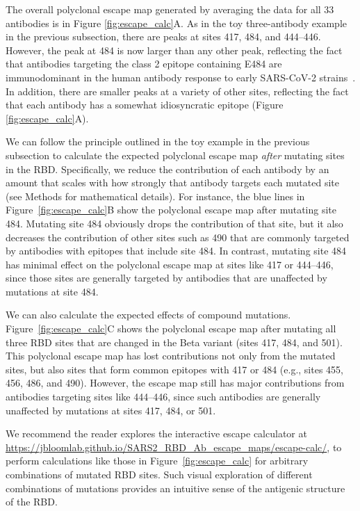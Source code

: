\documentclass[9pt,twocolumn,twoside]{gsajnl_modified}
\begin{document}
The overall polyclonal escape map generated by averaging the data for all 33 antibodies is in Figure \ref{fig:escape_calc}A.
As in the toy three-antibody example in the previous subsection, there are peaks at  sites 417, 484, and 444--446.
However, the peak at 484 is now larger than any other peak, reflecting the fact that antibodies targeting the class 2 epitope containing E484 are immunodominant in the human antibody response to early SARS-CoV-2 strains~\citep{yuan2020structural,robbiani2020convergent,greaney2021comprehensive,greaney2021mapping}.
In addition, there are smaller peaks at a variety of other sites, reflecting the fact that each antibody has a somewhat idiosyncratic epitope (Figure \ref{fig:escape_calc}A).

We can follow the principle outlined in the toy example in the previous subsection to calculate the expected polyclonal escape map \emph{after} mutating sites in the RBD.
Specifically, we reduce the contribution of each antibody by an amount that scales with how strongly that antibody targets each mutated site (see Methods for mathematical details).
For instance, the blue lines in Figure~\ref{fig:escape_calc}B show the polyclonal escape map after mutating site 484.
Mutating site 484 obviously drops the contribution of that site, but it also decreases the contribution of other sites such as 490 that are commonly targeted by antibodies with epitopes that include site 484.
In contrast, mutating site 484 has minimal effect on the polyclonal escape map at sites like 417 or 444--446, since those sites are generally targeted by antibodies that are unaffected by mutations at site 484.

We can also calculate the expected effects of compound mutations.
Figure~\ref{fig:escape_calc}C shows the polyclonal escape map after mutating all three RBD sites that are changed in the Beta variant (sites 417, 484, and 501).
This polyclonal escape map has lost contributions not only from the mutated sites, but also sites that form common epitopes with 417 or 484 (e.g., sites 455, 456, 486, and 490).
However, the escape map still has major contributions from antibodies targeting sites like 444--446, since such antibodies are generally unaffected by mutations at sites 417, 484, or 501.

We recommend the reader explores the interactive escape calculator at \url{https://jbloomlab.github.io/SARS2_RBD_Ab_escape_maps/escape-calc/}, to perform calculations like those in Figure~\ref{fig:escape_calc} for arbitrary combinations of mutated RBD sites.
Such visual exploration of different combinations of mutations provides an intuitive sense of the antigenic structure of the RBD.
\end{document}
